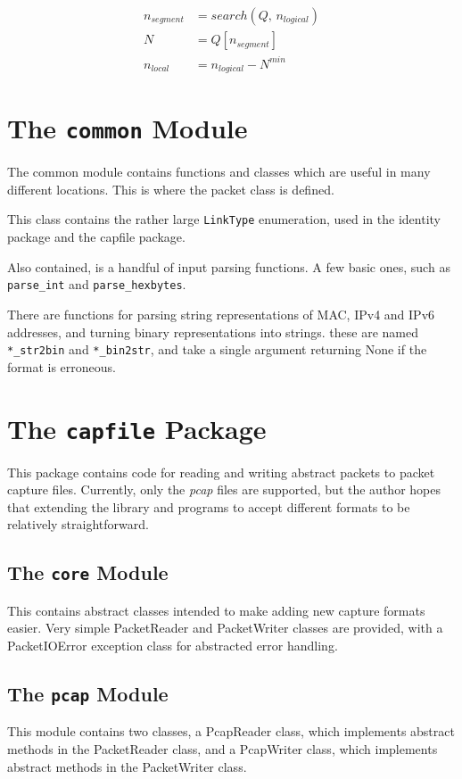 \documentclass[10pt,a4paper,notitlepage]{report}
\begin{document}
\begin{align*}
n_{segment} &= search(Q,\,n_{logical})\\
N &= Q[n_{segment}]\\
n_{local} &= n_{logical} - N^{min}
\end{align*}

\section{The \texttt{common} Module}
The common module contains functions and classes which are useful in many different locations.
This is where the packet class is defined.

This class contains the rather large \texttt{LinkType} enumeration, used in the identity package and the capfile package.

Also contained, is a handful of input parsing functions. A few basic ones, such as \texttt{parse_int} and \texttt{parse_hexbytes}.

There are functions for parsing string representations of MAC, IPv4 and IPv6 addresses, and turning binary representations into strings. these are named \texttt{*_str2bin} and \texttt{*_bin2str}, and take a single argument returning None if the format is erroneous.

\section{The \texttt{capfile} Package}
This package contains code for reading and writing abstract packets to packet capture files. Currently, only the \emph{pcap} files are supported, but the author hopes that extending the library and programs to accept different formats to be relatively straightforward.
 
\subsection{The \texttt{core} Module}
This contains abstract classes intended to make adding new capture formats easier. Very simple PacketReader and PacketWriter classes are provided, with a PacketIOError exception class for abstracted error handling.

\subsection{The \texttt{pcap} Module}
This module contains two classes, a PcapReader class, which implements abstract methods in the PacketReader class, and a PcapWriter class, which implements abstract methods in the PacketWriter class.
\end{document}
